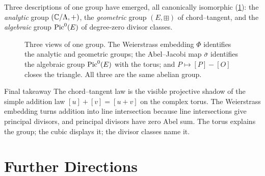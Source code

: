 Three descriptions of one group have emerged, all canonically isomorphic
(\cref{fig:syn-threeviews}): the \emph{analytic} group \((\mathbb{C}/\Lambda, +)\), the
\emph{geometric} group \((E, \boxplus)\) of chord--tangent, and the
\emph{algebraic} group \(\operatorname{Pic}^0(E)\) of degree-zero divisor classes.

\begin{figure}[ht]
\centering
{}
\caption{Three views of one group. The Weierstrass embedding \(\Phi\) identifies
the analytic and geometric groups; the Abel--Jacobi map \(\bar\sigma\) identifies
the algebraic group \(\operatorname{Pic}^0(E)\) with the torus; and \(P \mapsto [P]-[O]\) closes
the triangle. All three are the same abelian group.}
\label{fig:syn-threeviews}
\end{figure}

\begin{keyidea}{Final takeaway}
The chord--tangent law is the visible projective shadow of the simple addition
law \([u]+[v]=[u+v]\) on the complex torus. The Weierstrass embedding turns
addition into line intersection because line intersections give principal
divisors, and principal divisors have zero Abel sum. The torus explains the
group; the cubic displays it; the divisor classes name it.
\end{keyidea}

\section{Further Directions}
\label{sec:syn-further}

